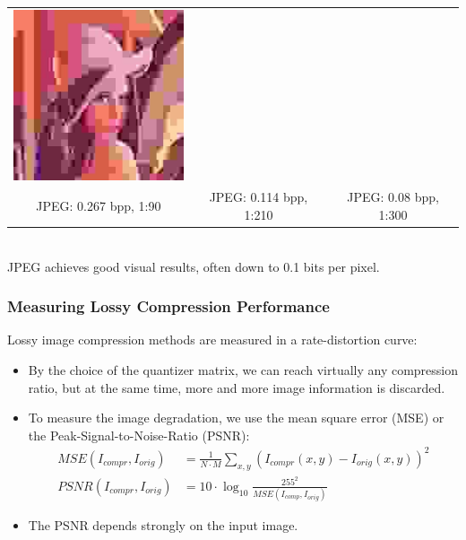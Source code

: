 \documentclass{beamer}
\begin{document}
\begin{frame}
\begin{tabular}{ccc}
\includegraphics[height=.31\textwidth]{lena-0080}
\\[-4pt]
\scriptsize JPEG: 0.267 bpp, 1:90 &\scriptsize  JPEG: 0.114 bpp, 1:210 &\scriptsize  JPEG: 0.08 bpp, 1:300
\end{tabular}
\\[3pt]

JPEG achieves good visual results, often down to 0.1 bits per pixel.
\end{frame}


\begin{frame}
\frametitle{Measuring Lossy Compression Performance}
Lossy image compression methods are measured in a rate-distortion curve:
\begin{itemize}
\item By the choice of the quantizer matrix, we can reach virtually 
any compression ratio, but at the same time, more and more image information 
is discarded. 
\item To measure the image degradation, we use the mean square error (MSE) 
or the Peak-Signal-to-Noise-Ratio (PSNR):
\begin{align*}
MSE(I_{compr},I_{orig}) &= \frac{1}{N\cdot M}{\sum_{x,y} (I_{compr}(x,y)-I_{orig}(x,y))^2}
\\
PSNR(I_{compr},I_{orig}) &= 10\cdot\log_{10} \frac{255^2}{MSE(I_{comp},I_{orig})}
\end{align*}
\item The PSNR depends strongly on the input image. 
\end{itemize}
\end{frame}
\end{document}
